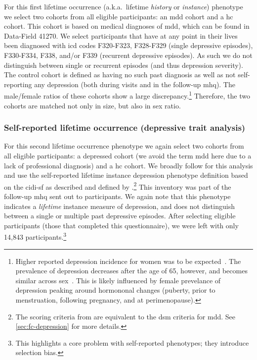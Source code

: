 For this first lifetime occurrence (a.k.a.~lifetime \emph{history} or \emph{instance}) phenotype we select two cohorts from all eligible participants: an \gls{mdd} cohort and a \gls{hc} cohort.
This cohort is based on medical diagnoses of \gls{mdd}, which can be found in Data-Field 41270.
We select participants that have at any point in their lives been diagnosed with \gls{icd} codes F320-F323, F328-F329 (single depressive episodes), F330-F334, F338, and/or F339 (recurrent depressive episodes).
As such we do not distinguish between single or recurrent episodes (and thus depression severity).
The control cohort is defined as having no such past diagnosis as well as not self-reporting any depression (both during visits and in the follow-up \gls{mhq}).
The male/female ratios of these cohorts show a large discrepancy.\footnote{Higher reported depression incidence for women was to be expected~\parencite{Albert2015, Bogren2018}. The prevalence of depression decreases after the age of 65, however, and becomes similar across sex~\parencite{Bebbington2003}. This is likely influenced by female prevelance of depression peaking around hormononal changes (puberty, prior to menstruation, following pregnancy, and at perimenopause).}
Therefore, the two cohorts are matched not only in size, but also in sex ratio.

\subsubsection{Self-reported lifetime occurrence (depressive trait analysis)}

For this second lifetime occurrence phenotype we again select two cohorts from all eligible participants: a depressed cohort (we avoid the term \gls{mdd} here due to a lack of professional diagnosis) and a \gls{hc} cohort.
We broadly follow \textcite{Howard2020} for this analysis and use the self-reported lifetime instance depression phenotype definition based on the \gls{cidi-sf} \parencite{Kessler1998} as described and defined by \textcite{Davis2020}.\footnote{The scoring criteria from \textcite{Davis2020} are equivalent to the \gls{dsm} criteria for \gls{mdd}. See \cref{sec:fc-depression} for more details.}
This inventory was part of the follow-up \gls{mhq} sent out to participants.
We again note that this phenotype indicates a \emph{lifetime} instance measure of depression, and does not distinguish between a single or multiple past depressive episodes.
After selecting eligible participants (those that completed this questionnaire), we were left with only 14,843 participants.\footnote{This highlights a core problem with self-reported phenotypes; they introduce selection bias.}

